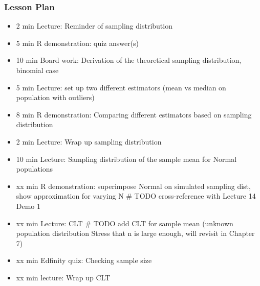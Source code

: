 

\begin{frame}
\frametitle{Lesson Plan}
\begin{itemize}
    \item 2 min Lecture: Reminder of sampling distribution
    \item 5 min R demonstration: quiz answer(s)
    \item 10 min Board work: Derivation of the theoretical sampling distribution, binomial case
    \item 5 min Lecture: set up two different estimators (mean vs median on population with outliers) 
    \item 8 min R demonstration: Comparing different estimators based on sampling distribution 
    \item 2 min Lecture: Wrap up sampling distribution

    \item 10 min Lecture: Sampling distribution of the sample mean for Normal populations 
    \item xx min R demonstration: superimpose Normal on simulated sampling dist, show approximation for varying N # TODO cross-reference with Lecture 14 Demo 1
    \item xx min Lecture: CLT # TODO add CLT for sample mean (unknown population distribution Stress that n is large enough, will revisit in Chapter 7)
    \item xx min Edfinity quiz: Checking sample size
    \item xx min lecture: Wrap up CLT
 \end{itemize}
\end{frame}
    

